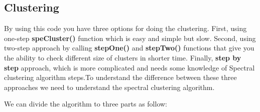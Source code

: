 \documentclass{article}
\begin{document}
\subsection {Clustering}
By using this code you have three options for doing the clustering. First, using one-step {\bf speCluster()} function which is easy and simple but slow. Second, using two-step approach by calling {\bf stepOne()} and {\bf stepTwo()} functions that give you the ability to check different size of clusters in shorter time. Finally,  {\bf step by step} approach, which is more complicated and needs some knowledge of Spectral clustering algorithm steps.To understand the difference between these three approaches we need to understand the spectral clustering algorithm.

We can divide the algorithm to three parts as follow:
\end{document}
